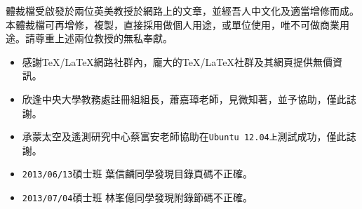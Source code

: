 \begin{acknowledgements} 

體裁檔受啟發於兩位英美教授於網路上的文章，並經吾人中文化及適當增修而成。本體裁檔可再增修，複製，直接採用做個人用途，或單位使用，唯不可做商業用途。請尊重上述兩位教授的無私奉獻。

\begin{itemize}
\item 感謝\TeX/\LaTeX{}網路社群內，龐大的\TeX/\LaTeX 社群及其網頁提供無價資訊。
\item 欣逢中央大學教務處註冊組組長，蕭嘉璋老師，見微知著，並予協助，僅此誌謝。
\item 承蒙太空及遙測研究中心蔡富安老師協助在{\tt Ubuntu 12.04上}\hfil{}測試成功，僅此誌謝。
\item \texttt{2013/06/13}碩士班 葉信麟同學發現目錄頁碼不正確。
\item \texttt{2013/07/04}碩士班 林峯億同學發現附錄節碼不正確。
\end{itemize}
\end{acknowledgements} 